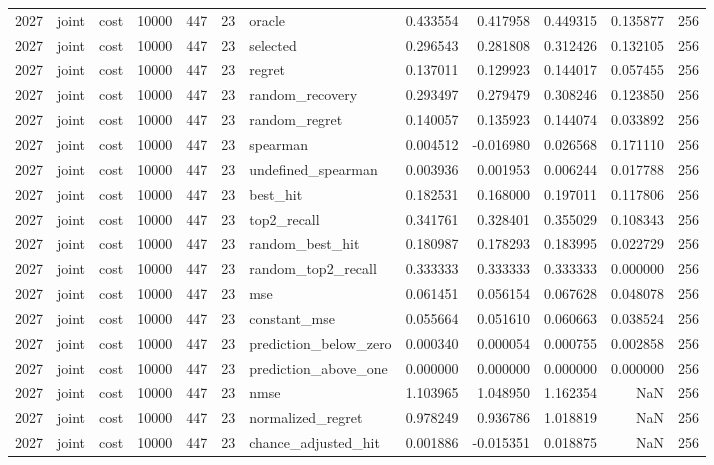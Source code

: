 \begin{tabular}{rllrrrlrrrrr}
2027 & joint & cost & 10000 & 447 & 23 & oracle & 0.433554 & 0.417958 & 0.449315 & 0.135877 & 256 \\
2027 & joint & cost & 10000 & 447 & 23 & selected & 0.296543 & 0.281808 & 0.312426 & 0.132105 & 256 \\
2027 & joint & cost & 10000 & 447 & 23 & regret & 0.137011 & 0.129923 & 0.144017 & 0.057455 & 256 \\
2027 & joint & cost & 10000 & 447 & 23 & random_recovery & 0.293497 & 0.279479 & 0.308246 & 0.123850 & 256 \\
2027 & joint & cost & 10000 & 447 & 23 & random_regret & 0.140057 & 0.135923 & 0.144074 & 0.033892 & 256 \\
2027 & joint & cost & 10000 & 447 & 23 & spearman & 0.004512 & -0.016980 & 0.026568 & 0.171110 & 256 \\
2027 & joint & cost & 10000 & 447 & 23 & undefined_spearman & 0.003936 & 0.001953 & 0.006244 & 0.017788 & 256 \\
2027 & joint & cost & 10000 & 447 & 23 & best_hit & 0.182531 & 0.168000 & 0.197011 & 0.117806 & 256 \\
2027 & joint & cost & 10000 & 447 & 23 & top2_recall & 0.341761 & 0.328401 & 0.355029 & 0.108343 & 256 \\
2027 & joint & cost & 10000 & 447 & 23 & random_best_hit & 0.180987 & 0.178293 & 0.183995 & 0.022729 & 256 \\
2027 & joint & cost & 10000 & 447 & 23 & random_top2_recall & 0.333333 & 0.333333 & 0.333333 & 0.000000 & 256 \\
2027 & joint & cost & 10000 & 447 & 23 & mse & 0.061451 & 0.056154 & 0.067628 & 0.048078 & 256 \\
2027 & joint & cost & 10000 & 447 & 23 & constant_mse & 0.055664 & 0.051610 & 0.060663 & 0.038524 & 256 \\
2027 & joint & cost & 10000 & 447 & 23 & prediction_below_zero & 0.000340 & 0.000054 & 0.000755 & 0.002858 & 256 \\
2027 & joint & cost & 10000 & 447 & 23 & prediction_above_one & 0.000000 & 0.000000 & 0.000000 & 0.000000 & 256 \\
2027 & joint & cost & 10000 & 447 & 23 & nmse & 1.103965 & 1.048950 & 1.162354 & NaN & 256 \\
2027 & joint & cost & 10000 & 447 & 23 & normalized_regret & 0.978249 & 0.936786 & 1.018819 & NaN & 256 \\
2027 & joint & cost & 10000 & 447 & 23 & chance_adjusted_hit & 0.001886 & -0.015351 & 0.018875 & NaN & 256 \\

\end{tabular}
